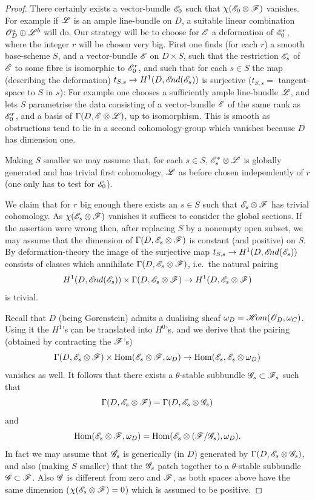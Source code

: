 \documentclass[12pt,english]{smfart}
\newcommand{\shHom}{\mathscr{H}\!om} \newcommand{\shEnd}{\mathscr{E}\!nd} \newcommand{\shAut}{\mathfrak{A}ut} \newcommand{\End}{\mathscr{E}\!nd} \newcommand{\Isom}{\mathscr{I}\!som} \newcommand{\Char}{\mathscr{C}\!har} \newcommand{\Conn}{\mathscr{C}\!onn} \newcommand{\Diff}{\mathscr{D}\!iff} \newcommand{\Bor}{\mathscr{B}or} \newcommand{\Flag}{\mathscr{F}\!lag} \renewcommand{\Im}{\mathscr{I}\!m}
\DeclareMathOperator{\Hom}{Hom} \DeclareMathOperator{\Ext}{Ext} \DeclareMathOperator{\Der}{Der} \DeclareMathOperator{\rank}{rank} \DeclareMathOperator{\rk}{rk} \DeclareMathOperator{\Spec}{Spec} \DeclareMathOperator{\depth}{depth} \DeclareMathOperator{\genus}{genus} \DeclareMathOperator{\Lie}{Lie} \DeclareMathOperator{\Ad}{Ad} \DeclareMathOperator{\ad}{ad} \DeclareMathOperator{\id}{id} \DeclareMathOperator{\tr}{tr} \DeclareMathOperator{\ch}{ch} \DeclareMathOperator{\Td}{Td} \DeclareMathOperator{\gr}{gr} \DeclareMathOperator{\Pic}{Pic} \DeclareMathOperator{\Aut}{Aut} \DeclareMathOperator{\Out}{Out} \DeclareMathOperator{\Gal}{Gal} \DeclareMathOperator{\PGL}{PGL} \DeclareMathOperator{\GL}{GL} \DeclareMathOperator{\SL}{SL} \DeclareMathOperator{\Ima}{Im} \newcommand{\HDR}{H_{\mathrm{DR}}} \newcommand{\Mpar}{\sM^{0}_{\theta}(\sG)_{\mathrm{par}}}
\theoremstyle{plain} \newtheorem{innerthm}{Theorem} \newtheorem{innerlem}{Lemma} \newtheorem{innerprop}{Proposition} \newtheorem{innercor}{Corollary} \theoremstyle{definition} \newtheorem{innerdefn}{Definition} \newtheorem{innerconstr}{Construction} \theoremstyle{remark} \newtheorem*{remark}{Remark} \newtheorem*{remarks}{Remarks} \newtheorem*{applications}{Applications}
\begin{document}
\begin{proof}
There certainly exists a vector-bundle $\mathscr{E}_0$ such that $\chi(\mathscr{E}_0\otimes\mathscr{F})$ vanishes. For example if $\mathscr{L}$ is an ample line-bundle on $D$, a suitable linear combination $\mathscr{O}_D^a\oplus\mathscr{L}^b$ will do. Our strategy will be to choose for $\mathscr{E}$ a deformation of $\mathscr{E}_0^r$, where the integer $r$ will be chosen very big. First one finds (for each $r$) a smooth base-scheme $S$, and a vector-bundle $\mathscr{E}$ on $D\times S$, such that the restriction $\mathscr{E}_s$ of $\mathscr{E}$ to some fibre is isomorphic to $\mathscr{E}_0^r$, and such that for each $s\in S$ the map (describing the deformation) $t_{S,s}\to H^1(D,\shEnd(\sE_s))$ is surjective ($t_{S,s}=$ tangent-space to $S$ in $s$): For example one chooses a sufficiently ample line-bundle $\mathscr{L}$, and lets $S$ parametrise the data consisting of a vector-bundle $\mathscr{E}$ of the same rank as $\mathscr{E}_0^r$, and a basis of $\Gamma(D,\mathscr{E}\otimes\mathscr{L})$, up to isomorphism. This is smooth as obstructions tend to lie in a second cohomology-group which vanishes because $D$ has dimension one.

Making $S$ smaller we may assume that, for each $s\in S$, $\mathscr{E}_s^*\otimes\mathscr{L}$ is globally generated and has trivial first cohomology, $\mathscr{L}$ as before chosen independently of $r$ (one only has to test for $\mathscr{E}_0$).

We claim that for $r$ big enough there exists an $s\in S$ such that $\mathscr{E}_s\otimes\mathscr{F}$ has trivial cohomology. As $\chi(\mathscr{E}_s\otimes\mathscr{F})$ vanishes it suffices to consider the global sections. If the assertion were wrong then, after replacing $S$ by a nonempty open subset, we may assume that the dimension of $\Gamma(D,\mathscr{E}_s\otimes\mathscr{F})$ is constant (and positive) on $S$. By deformation-theory the image of the surjective map $t_{S,s}\to H^1(D,\shEnd(\sE_s))$ consists of classes which annihilate $\Gamma(D,\mathscr{E}_s\otimes\mathscr{F})$, i.e.\ the natural pairing
\[
H^1(D,\shEnd(\sE_s))\times\Gamma(D,\sE_s\otimes\sF)\to
H^1(D,\sE_s\otimes\sF)
\]
is trivial.

Recall that $D$ (being Gorenstein) admits a dualising sheaf $\omega_D=\shHom(\sO_D,\omega_C)$. Using it the $H^1$'s can be translated into $H^0$'s, and we derive that the pairing (obtained by contracting the $\mathscr{F}$'s)
\[
\Gamma(D,\sE_s\otimes\sF)\times\Hom(\sE_s\otimes\sF,\omega_D)\to
\Hom(\sE_s,\sE_s\otimes\omega_D)
\]
vanishes as well. It follows that there exists a $\theta$-stable subbundle $\mathscr{G}_s\subset\mathscr{F}_s$ such that
\[
\Gamma(D,\mathscr{E}_s\otimes\mathscr{F})=\Gamma(D,\mathscr{E}_s\otimes\mathscr{G}_s)
\]
and
\[
\Hom(\sE_s\otimes\sF,\omega_D)=\Hom(\sE_s\otimes(\sF/\sG_s),\omega_D).
\]
In fact we may assume that $\mathscr{G}_s$ is generically (in $D$) generated by $\Gamma(D,\mathscr{E}_s\otimes\mathscr{G}_s)$, and also (making $S$ smaller) that the $\mathscr{G}_s$ patch together to a $\theta$-stable subbundle $\mathscr{G}\subset\mathscr{F}$. Also $\mathscr{G}$ is different from zero and $\mathscr{F}$, as both spaces above have the same dimension ($\chi(\mathscr{E}_s\otimes\mathscr{F})=0$) which is assumed to be positive.


\end{proof}
\end{document}

